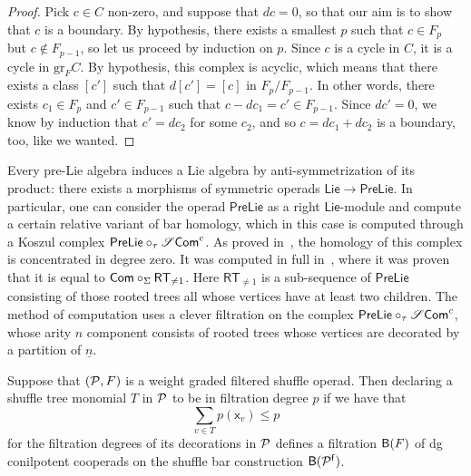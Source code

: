   \begin{proof}
  Pick $c\in C$ non-zero, 
  and suppose that $dc=0$,
  so that our aim is to show that $c$ is a boundary.
  By hypothesis, there exists a smallest $p$
  such that $c\in F_p$ but $c\notin F_{p-1}$,
  so let us proceed by induction on $p$.
  Since $c$ is a cycle in $C$, it is a cycle
  in $\mathrm{gr}_F C$. 
  By hypothesis, this complex is acyclic, 
  which means that there exists a class $[c']$
  such that $d[c'] = [c]$ in $F_p/F_{p-1}$. In
  other words, there exists $c_1\in F_p$ and
  $c'\in F_{p-1}$ such that
  $c- dc_1 = c'\in F_{p-1}$.
 Since $dc' = 0$, we know by induction that $c'=dc_2$
 for some $c_2$, and so $c = dc_1+dc_2$ is a
 boundary, too, like we wanted.
  \end{proof}
  
  \begin{example}
Every pre-Lie algebra induces a Lie algebra
by anti-symmetrization of its product: there
exists a morphisms of symmetric operads
$\mathsf{Lie}\longrightarrow \mathsf{PreLie}$.
In particular, one can consider the operad
$\mathsf{PreLie}$ as a right $\mathsf{Lie}$-module
and compute a certain relative 
variant of bar homology,
which in this case is computed through a 
Koszul complex $\mathsf{PreLie}\circ_\tau 
\mathscr{S}\mathsf{Com}^c$. As proved in~\cite{DotsenkoTamaroff2020}, the homology
of this complex is concentrated in degree zero.
It was computed in full in~\cite{Dotsenko2020Schur}, where it was proven
that it is equal to $\mathsf{Com}\circ_\Sigma \mathsf{RT}_{\neq 1}$. Here $\mathsf{RT}_{\neq 1}$ is a
sub-sequence of $\mathsf{PreLie}$ consisting
of those rooted trees all whose vertices
have at least two children. The method of
computation uses a clever filtration on 
the complex
$\mathsf{PreLie}\circ_\tau 
\mathscr{S}\mathsf{Com}^c$, whose arity $n$ component
consists of rooted
trees whose vertices are decorated by 
a partition of $\underline{n}$.
  \end{example}
  
  

 
 \begin{lemma}
 Suppose that $(\mathcal P,F)$ is a
 weight graded filtered shuffle operad.
 Then declaring a shuffle tree monomial $T$ in $\mathcal P$
 to be in filtration degree $p$ if we have that
 \[\sum_{v\in T} p(\mathsf{x}_v) \leqslant p \]
 for the filtration degrees of its decorations
 in $\mathcal P$ defines a filtration $\mathsf{B}(F)$ 
 of dg conilpotent
 cooperads on the shuffle bar construction
 $\mathsf{B}(\mathcal P^{\mathsf{f}})$.
 \end{lemma}
 
